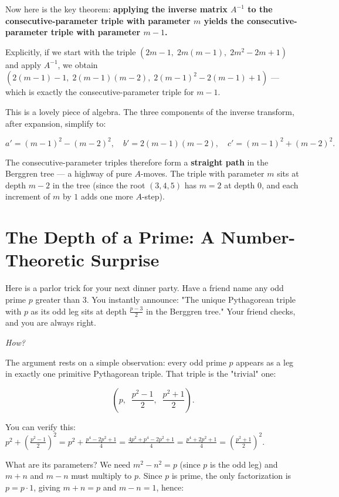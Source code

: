 \documentclass[11pt,twoside,openright]{book}
\theoremstyle{definition}
\theoremstyle{remark}
\begin{document}
Now here is the key theorem: \textbf{applying the inverse matrix $A^{-1}$ to the consecutive-parameter triple with parameter $m$ yields the consecutive-parameter triple with parameter $m - 1$.}

Explicitly, if we start with the triple $(2m - 1,\; 2m(m-1),\; 2m^2 - 2m + 1)$ and apply $A^{-1}$, we obtain $(2(m-1) - 1,\; 2(m-1)(m-2),\; 2(m-1)^2 - 2(m-1) + 1)$ --- which is exactly the consecutive-parameter triple for $m - 1$.

This is a lovely piece of algebra. The three components of the inverse transform, after expansion, simplify to:

\[a' = (m-1)^2 - (m-2)^2, \quad b' = 2(m-1)(m-2), \quad c' = (m-1)^2 + (m-2)^2.\]

The consecutive-parameter triples therefore form a \textbf{straight path} in the Berggren tree --- a highway of pure $A$-moves. The triple with parameter $m$ sits at depth $m - 2$ in the tree (since the root $(3, 4, 5)$ has $m = 2$ at depth $0$, and each increment of $m$ by $1$ adds one more $A$-step).



\section{The Depth of a Prime: A Number-Theoretic Surprise}

Here is a parlor trick for your next dinner party. Have a friend name any odd prime $p$ greater than $3$. You instantly announce: "The unique Pythagorean triple with $p$ as its odd leg sits at depth $\frac{p-3}{2}$ in the Berggren tree." Your friend checks, and you are always right.

\textit{How?}

The argument rests on a simple observation: every odd prime $p$ appears as a leg in exactly one primitive Pythagorean triple. That triple is the "trivial" one:

\[\left(p,\;\; \frac{p^2 - 1}{2},\;\; \frac{p^2 + 1}{2}\right).\]

You can verify this: $p^2 + \left(\frac{p^2-1}{2}\right)^2 = p^2 + \frac{p^4 - 2p^2 + 1}{4} = \frac{4p^2 + p^4 - 2p^2 + 1}{4} = \frac{p^4 + 2p^2 + 1}{4} = \left(\frac{p^2+1}{2}\right)^2$.

What are its parameters? We need $m^2 - n^2 = p$ (since $p$ is the odd leg) and $m + n$ and $m - n$ must multiply to $p$. Since $p$ is prime, the only factorization is $p = p \cdot 1$, giving $m + n = p$ and $m - n = 1$, hence:
\end{document}
